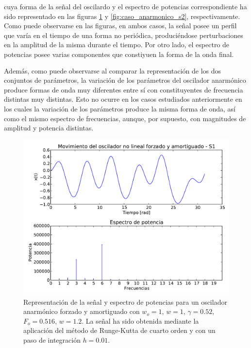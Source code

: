 \documentclass[11pt]{article}
\begin{document}
cuya forma de la señal del oscilardo y el espectro de potencias correspondiente ha sido representado en las figuras \ref{fig:caso_anarmonico_s1} y \ref{fig:caso_anarmonico_s2}, respectivamente. Como puede observarse en las figuras, en ambos casos, la señal posee un perfil que varía en el tiempo de una forma no periódica, produciéndose perturbaciones en la amplitud de la misma durante el tiempo. Por otro lado, el espectro de potencias posee varias componentes que constiyuen la forma de la onda final. 

Además, como puede observarse al comparar la representación de los dos conjuntos de parámetros, la variación de los parámetros del oscilador anarmónico produce formas de onda muy diferentes entre sí con constituyentes de frecuencia distintas muy distintas. Esto no ocurre en los casos estudiados anteriormente en los cuales la variación de los parámetros produce la misma forma de onda, así como el mismo espectro de frecuencias, aunque, por supuesto, con magnitudes de amplitud y potencia distintas.

\begin{figure}[h]
\centering
\includegraphics[width=0.75\linewidth]{caso_anarmonico_s1.pdf}
\caption{Representación de la señal y espectro de potencias para un oscilador anarmónico forzado y amortiguado con $w_o = 1$, $w = 1$, $\gamma = 0.52$, $F_o = 0.516$, $w = 1.2$. La señal ha sido obtenida mediante la aplicación del método de Runge-Kutta de cuarto orden y con un paso de integración $h = 0.01$.}
\label{fig:caso_anarmonico_s1}
\end{figure}
\end{document}

